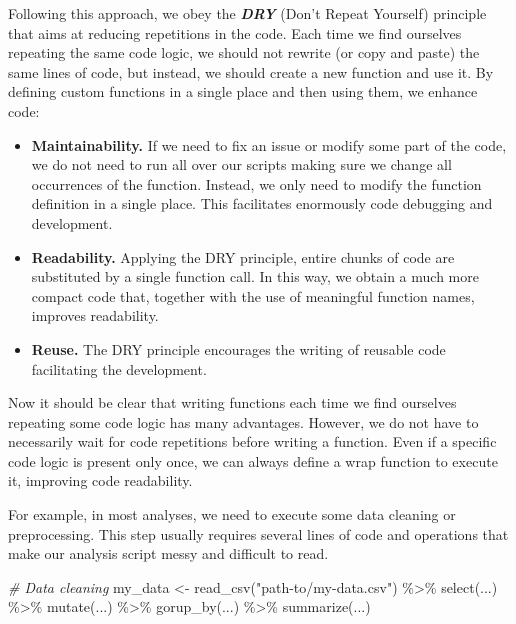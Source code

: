 \documentclass[
  11pt,
]{book}
\newenvironment{Shaded}{\begin{snugshade}}{\end{snugshade}}
\newcommand{\CommentTok}[1]{\textcolor[rgb]{0.56,0.35,0.01}{\textit{#1}}}
\newcommand{\FunctionTok}[1]{\textcolor[rgb]{0.00,0.00,0.00}{#1}}
\newcommand{\NormalTok}[1]{#1}
\newcommand{\OtherTok}[1]{\textcolor[rgb]{0.56,0.35,0.01}{#1}}
\newcommand{\SpecialCharTok}[1]{\textcolor[rgb]{0.00,0.00,0.00}{#1}}
\newcommand{\StringTok}[1]{\textcolor[rgb]{0.31,0.60,0.02}{#1}}
\providecommand{\tightlist}{%
  \setlength{\itemsep}{0pt}\setlength{\parskip}{0pt}}
\newenvironment{code-tex-bad}
  {\begingroup\definecolor{shadecolor}{RGB}{255, 189, 185}}
  {\endgroup}
\begin{document}
Following this approach, we obey the \textbf{\emph{DRY}} (Don't Repeat Yourself) principle that aims at reducing repetitions in the code. Each time we find ourselves repeating the same code logic, we should not rewrite (or copy and paste) the same lines of code, but instead, we should create a new function and use it. By defining custom functions in a single place and then using them, we enhance code:

\begin{itemize}
\tightlist
\item
  \textbf{Maintainability.} If we need to fix an issue or modify some part of the code, we do not need to run all over our scripts making sure we change all occurrences of the function. Instead, we only need to modify the function definition in a single place. This facilitates enormously code debugging and development.
\item
  \textbf{Readability.} Applying the DRY principle, entire chunks of code are substituted by a single function call. In this way, we obtain a much more compact code that, together with the use of meaningful function names, improves readability.
\item
  \textbf{Reuse.} The DRY principle encourages the writing of reusable code facilitating the development.
\end{itemize}

Now it should be clear that writing functions each time we find ourselves repeating some code logic has many advantages. However, we do not have to necessarily wait for code repetitions before writing a function. Even if a specific code logic is present only once, we can always define a wrap function to execute it, improving code readability.

For example, in most analyses, we need to execute some data cleaning or preprocessing. This step usually requires several lines of code and operations that make our analysis script messy and difficult to read.

\begin{code-tex-bad}

\begin{Shaded}
\begin{Highlighting}[]
\CommentTok{\# Data cleaning}
\NormalTok{my\_data }\OtherTok{\textless{}{-}} \FunctionTok{read\_csv}\NormalTok{(}\StringTok{"path{-}to/my{-}data.csv"}\NormalTok{) }\SpecialCharTok{\%\textgreater{}\%} 
  \FunctionTok{select}\NormalTok{(...) }\SpecialCharTok{\%\textgreater{}\%} 
  \FunctionTok{mutate}\NormalTok{(...) }\SpecialCharTok{\%\textgreater{}\%} 
  \FunctionTok{gorup\_by}\NormalTok{(...) }\SpecialCharTok{\%\textgreater{}\%} 
  \FunctionTok{summarize}\NormalTok{(...)}
\end{Highlighting}
\end{Shaded}

\end{code-tex-bad}
\end{document}
